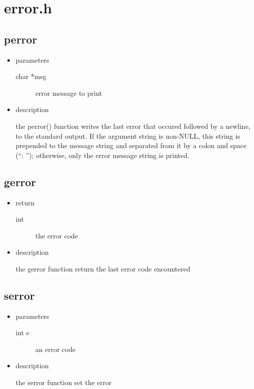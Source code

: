 \section{error.h}

\subsection{perror}
\begin{itemize}
\item{parameters}
\begin{description}
	\item[char *msg] error message to print
\end{description}
\item{description}

the perror() function writes the last error that occured followed by a newline, to
the standard output.  If the argument string is non-NULL, this string is prepended
to the message string and separated from it by a colon and space (``: ''); otherwise,
only the error message string is printed.
\end{itemize}

\subsection{gerror}
\begin{itemize}
\item{return}
\begin{description}
	\item[int] the error code
\end{description}
\item{description}

the gerror function return the last error code encountered
\end{itemize}

\subsection{serror}
\begin{itemize}
\item{parameters}
\begin{description}
	\item[int e] an error code
\end{description}
\item{description}

the serror function set the error
\end{itemize}

